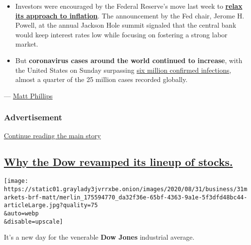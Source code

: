 \begin{itemize}
{  Hathaway}, which is owned by the legendary investor Warren Buffett,
  \href{https://www.wsj.com/articles/berkshire-hathaway-buys-stakes-in-five-japanese-trading-companies-11598841219?mod=hp_lead_pos3}{bought
  stakes in five of Japan's biggest trading companies}, including
  \textbf{Mitsubishi} and \textbf{Mitsui}.
\item
  Investors were encouraged by the Federal Reserve's move last week to
  \textbf{\href{https://www.nytimes3xbfgragh.onion/2020/08/27/business/economy/federal-reserve-inflation-jerome-powell.html}{relax
  its approach to inflation}}. The announcement by the Fed chair, Jerome
  H. Powell, at the annual Jackson Hole summit signaled that the central
  bank would keep interest rates low while focusing on fostering a
  strong labor market.
\item
  But \textbf{coronavirus cases around the world continued to increase},
  with the United States on Sunday surpassing
  \href{https://www.nytimes3xbfgragh.onion/2020/08/30/world/coronavirus-covid.html}{six
  million confirmed infections}, almost a quarter of the 25 million
  cases recorded globally.
\end{itemize}

--- \href{https://www.nytimes3xbfgragh.onion/by/matt-phillips}{Matt
Phillips}

\hypertarget{advertisement}{%
\subsubsection{Advertisement}\label{advertisement}}

\protect\hyperlink{after-dfp-ad-mid1}{Continue reading the main story}

\hypertarget{why-the-dow-revamped-its-lineup-of-stocks}{%
\subsection{\texorpdfstring{\protect\hyperlink{why-the-dow-revamped-its-lineup-of-stocks}{Why
the Dow revamped its lineup of
stocks.}}{Why the Dow revamped its lineup of stocks.}}\label{why-the-dow-revamped-its-lineup-of-stocks}}

\texttt{[image: https://static01.graylady3jvrrxbe.onion/images/2020/08/31/business/31markets-brf-matt/merlin\_175594770\_da32f36e-65bf-4363-9a1e-5f3dfd48bc44-articleLarge.jpg?quality=75\\\&auto=webp\\\&disable=upscale]}

It's a new day for the venerable \textbf{Dow Jones} industrial average.

